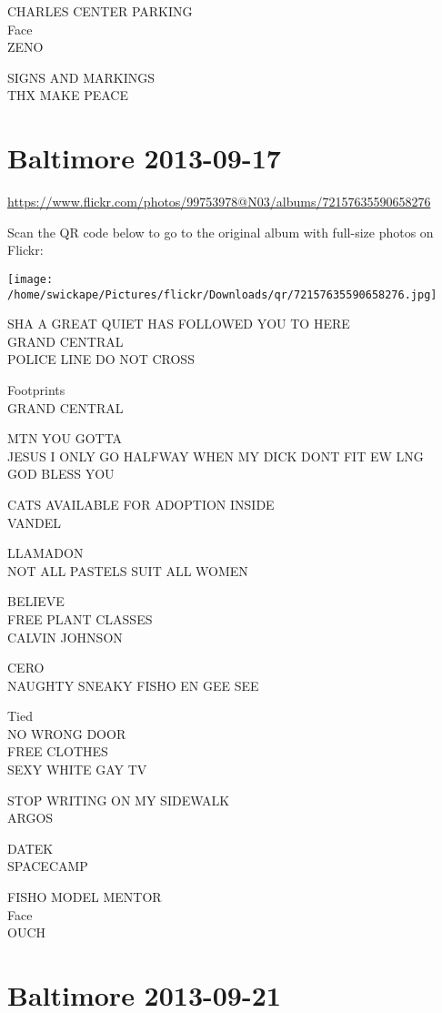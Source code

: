 \documentclass[10pt,letterpaper]{article}
\begin{document}
CHARLES CENTER PARKING\\
Face\\
ZENO

SIGNS AND MARKINGS\\
THX MAKE PEACE
\pagebreak

\section*{Baltimore 2013-09-17}

\url{https://www.flickr.com/photos/99753978@N03/albums/72157635590658276}

Scan the QR code below to go to the original album with full-size photos on Flickr:

\texttt{[image: /home/swickape/Pictures/flickr/Downloads/qr/72157635590658276.jpg]}
\pagebreak

SHA A GREAT QUIET HAS FOLLOWED YOU TO HERE\\
GRAND CENTRAL\\
POLICE LINE DO NOT CROSS

Footprints\\
GRAND CENTRAL

MTN YOU GOTTA\\
JESUS I ONLY GO HALFWAY WHEN MY DICK DONT FIT EW LNG\\
GOD BLESS YOU

CATS AVAILABLE FOR ADOPTION INSIDE\\
VANDEL

LLAMADON\\
NOT ALL PASTELS SUIT ALL WOMEN

BELIEVE\\
FREE PLANT CLASSES\\
CALVIN JOHNSON

CERO\\
NAUGHTY SNEAKY FISHO EN GEE SEE

Tied\\
NO WRONG DOOR\\
FREE CLOTHES\\
SEXY WHITE GAY TV

STOP WRITING ON MY SIDEWALK\\
ARGOS

DATEK\\
SPACECAMP

FISHO MODEL MENTOR\\
Face\\
OUCH
\pagebreak

\section*{Baltimore 2013-09-21}
\end{document}
